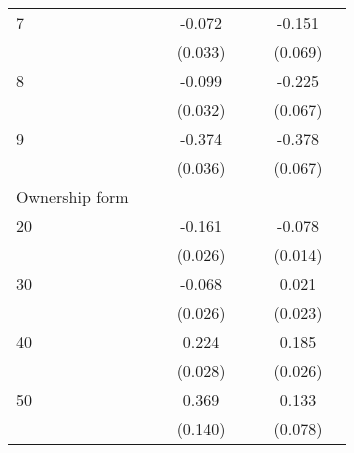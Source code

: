 {\begin{longtable}{l*{3}{c}|l*{3}{c}}
		7                   &                     &                     &      -0.072\sym{*}  &                     &                     &      -0.151\sym{*}  \\
		&                     &                     &     (0.033)         &                     &                     &     (0.069)         \\
		8                   &                     &                     &      -0.099\sym{**} &                     &                     &      -0.225\sym{***}\\
		&                     &                     &     (0.032)         &                     &                     &     (0.067)         \\
		9                   &                     &                     &      -0.374\sym{***}&                     &                     &      -0.378\sym{***}\\
		&                     &                     &     (0.036)         &                     &                     &     (0.067)         \\
		Ownership form &&&&&\\
		20                  &                     &                     &      -0.161\sym{***}&                     &                     &      -0.078\sym{***}\\
		&                     &                     &     (0.026)         &                     &                     &     (0.014)         \\
		30                  &                     &                     &      -0.068\sym{**} &                     &                     &       0.021         \\
		&                     &                     &     (0.026)         &                     &                     &     (0.023)         \\
		40                  &                     &                     &       0.224\sym{***}&                     &                     &       0.185\sym{***}\\
		&                     &                     &     (0.028)         &                     &                     &     (0.026)         \\
		50                  &                     &                     &       0.369\sym{**} &                     &                     &       0.133         \\
		&                     &                     &     (0.140)         &                     &                     &     (0.078)         \\

\end{longtable}}
